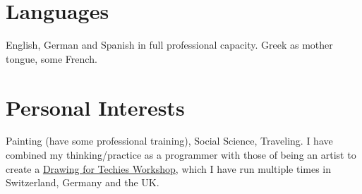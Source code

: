 \documentclass[9pt]{article} %
\begin{document}
\begin{minipage}[t]{0.5\textwidth}








	

\end{minipage} %
\hfill
\begin{minipage}[t]{0.44\textwidth} %
\vspace{0pt} %


\section{Languages} 
\normalsize{English, German and Spanish in full professional capacity. Greek as mother tongue, some French.}\\

\section{Personal Interests} 
    \normalsize{Painting (have some professional training), Social Science, Traveling. I have combined my thinking/practice as a programmer with those of being an artist to create a \href{https://medium.com/@_sandtweets/learn-drawing-and-programming-at-the-same-time-at-mozfest-2017-6a9f8627b72}{Drawing for Techies Workshop}, which I have run multiple times in Switzerland, Germany and the UK.}\\
	
\end{minipage} %
\end{document}
